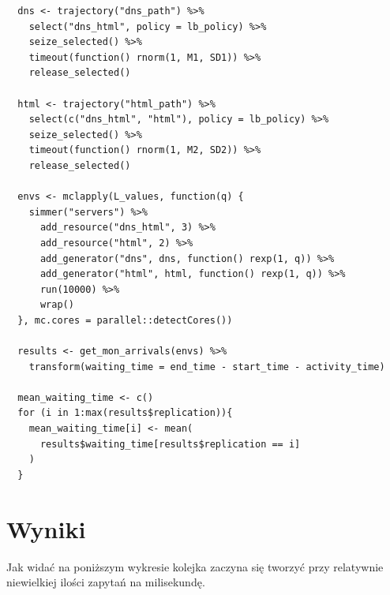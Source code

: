 \documentclass[12pt,oneside,a4paper]{book} %
\theoremstyle{break}
\begin{document}
\begin{verbatim}
  dns <- trajectory("dns_path") %>%
    select("dns_html", policy = lb_policy) %>% 
    seize_selected() %>%
    timeout(function() rnorm(1, M1, SD1)) %>%
    release_selected()

  html <- trajectory("html_path") %>%
    select(c("dns_html", "html"), policy = lb_policy) %>%
    seize_selected() %>%
    timeout(function() rnorm(1, M2, SD2)) %>%
    release_selected()

  envs <- mclapply(L_values, function(q) {
    simmer("servers") %>%
      add_resource("dns_html", 3) %>%
      add_resource("html", 2) %>%
      add_generator("dns", dns, function() rexp(1, q)) %>%
      add_generator("html", html, function() rexp(1, q)) %>%
      run(10000) %>%
      wrap()
  }, mc.cores = parallel::detectCores())

  results <- get_mon_arrivals(envs) %>% 
    transform(waiting_time = end_time - start_time - activity_time)

  mean_waiting_time <- c()
  for (i in 1:max(results$replication)){
    mean_waiting_time[i] <- mean(
      results$waiting_time[results$replication == i]
    )
  }
\end{verbatim}

\section*{Wyniki}

Jak widać na poniższym wykresie kolejka zaczyna się tworzyć przy relatywnie niewielkiej ilości zapytań na milisekundę.
\end{document}
